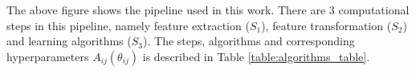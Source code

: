 

  The above figure shows the pipeline used in this work. There are 3 computational steps in this pipeline, namely feature extraction ($S_1$), feature transformation ($S_2$) and learning algorithms ($S_3$). The steps, algorithms and corresponding hyperparameters $A_{ij}(\theta_{ij})$ is described in Table \ref{table:algorithms_table}.

